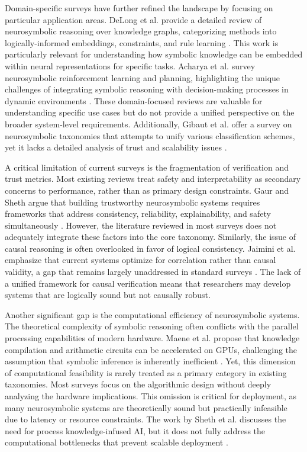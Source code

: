 \documentclass{article}
\begin{document}
Domain-specific surveys have further refined the landscape by focusing on particular application areas. DeLong et al. provide a detailed review of neurosymbolic reasoning over knowledge graphs, categorizing methods into logically-informed embeddings, constraints, and rule learning \cite{delong2023neurosymbolic}. This work is particularly relevant for understanding how symbolic knowledge can be embedded within neural representations for specific tasks. Acharya et al. survey neurosymbolic reinforcement learning and planning, highlighting the unique challenges of integrating symbolic reasoning with decision-making processes in dynamic environments \cite{acharya2023neurosymbolic}. These domain-focused reviews are valuable for understanding specific use cases but do not provide a unified perspective on the broader system-level requirements. Additionally, Gibaut et al. offer a survey on neurosymbolic taxonomies that attempts to unify various classification schemes, yet it lacks a detailed analysis of trust and scalability issues \cite{gibaut2023neurosymbolic}.

A critical limitation of current surveys is the fragmentation of verification and trust metrics. Most existing reviews treat safety and interpretability as secondary concerns to performance, rather than as primary design constraints. Gaur and Sheth argue that building trustworthy neurosymbolic systems requires frameworks that address consistency, reliability, explainability, and safety simultaneously \cite{gaur2023building}. However, the literature reviewed in most surveys does not adequately integrate these factors into the core taxonomy. Similarly, the issue of causal reasoning is often overlooked in favor of logical consistency. Jaimini et al. emphasize that current systems optimize for correlation rather than causal validity, a gap that remains largely unaddressed in standard surveys \cite{jaimini2024causal}. The lack of a unified framework for causal verification means that researchers may develop systems that are logically sound but not causally robust.

Another significant gap is the computational efficiency of neurosymbolic systems. The theoretical complexity of symbolic reasoning often conflicts with the parallel processing capabilities of modern hardware. Maene et al. propose that knowledge compilation and arithmetic circuits can be accelerated on GPUs, challenging the assumption that symbolic inference is inherently inefficient \cite{maene2024klay}. Yet, this dimension of computational feasibility is rarely treated as a primary category in existing taxonomies. Most surveys focus on the algorithmic design without deeply analyzing the hardware implications. This omission is critical for deployment, as many neurosymbolic systems are theoretically sound but practically infeasible due to latency or resource constraints. The work by Sheth et al. discusses the need for process knowledge-infused AI, but it does not fully address the computational bottlenecks that prevent scalable deployment \cite{sheth2023neurosymbolic}.
\end{document}
